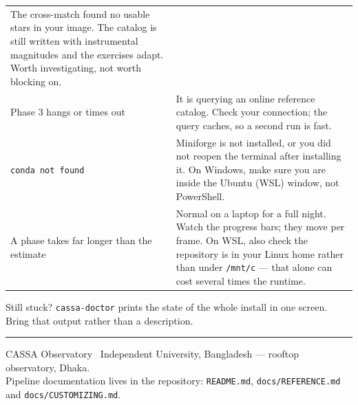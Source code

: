 \documentclass[11pt,a4paper]{article}
\newcommand{\cm}[1]{\texttt{\small #1}}
\begin{document}
\begin{longtable}{@{}p{5.6cm}p{9.2cm}@{}}
The cross-match found no usable stars in your image. The catalog is still written with
instrumental magnitudes and the exercises adapt. Worth investigating, not worth blocking on. \\
Phase 3 hangs or times out &
It is querying an online reference catalog. Check your connection; the query caches, so a
second run is fast. \\
\cm{conda not found} &
Miniforge is not installed, or you did not reopen the terminal after installing it. On Windows,
make sure you are inside the Ubuntu (WSL) window, not PowerShell. \\
A phase takes far longer than the estimate &
Normal on a laptop for a full night. Watch the progress bars; they move per frame. On WSL,
also check the repository is in your Linux home rather than under \cm{/mnt/c} --- that alone
can cost several times the runtime. \\
\bottomrule
\end{longtable}

Still stuck? \cm{cassa-doctor} prints the state of the whole install in one screen. Bring that
output rather than a description.

\vspace{18pt}
{\color{rule}\hrule}
\vspace{8pt}
{\sffamily\scriptsize\color{inkfaint}
CASSA Observatory \textbullet\ Independent University, Bangladesh --- rooftop observatory,
Dhaka.\\
Pipeline documentation lives in the repository: \texttt{README.md},
\texttt{docs/REFERENCE.md} and \texttt{docs/CUSTOMIZING.md}.}
\end{document}
